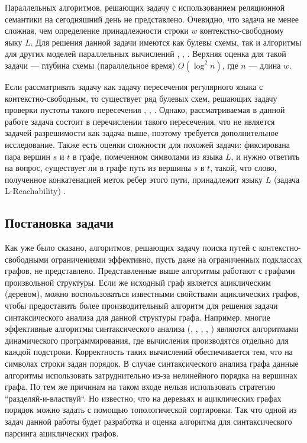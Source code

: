 \documentclass{spbau-diploma}
\begin{document}
Параллельных алгоритмов, решающих задачу с использованием реляционной семантики на сегодняшний день не представлено. Очевидно, что задача не менее сложная, чем определение принадлежности строки $w$ контекстно-свободному яыку $L$. Для решения данной задачи имеются как булевы схемы, так и алгоритмы для других моделей параллельных вычислений \cite{Brent}, \cite{Ruzzo}, \cite{Rytter}. Верхняя оценка для такой задачи --- глубина схемы (параллельное время) $O(\log^2 n)$, где $n$ --- длина $w$.

Если рассматривать задачу как задачу пересечения регулярного языка с контекстно-свободным, то существует ряд булевых схем, решающих задачу проверки пустоты такого пересечения \cite{Lohrey}, \cite{Regularrealizability}, \cite{Swernofsky2015OnTC}. Однако, рассматриваемая в данной работе задача состоит в перечислении такого пересечения, что не является задачей разрешимости как задача выше, поэтому требуется дополнительное исследование. Также есть оценки сложности для похожей задачи: фиксирована пара вершин $s$ и $t$ в графе, помеченном символами из языка $L$, и нужно ответить на вопрос, cуществует ли в графе путь из вершины $s$ в $t$, такой, что слово, полученное конкатенацией меток ребер этого пути, принадлежит языку $L$ (задача L-Reachability) \cite{LReach}.
\subsection{Постановка задачи}
Как уже было сказано, алгоритмов, решающих задачу поиска путей с контекстно-свободными ограничениями эффективно, пусть даже на ограниченных подклассах графов, не представлено. 
Представленные выше алгоритмы работают с графами произвольной
структуры. Если же исходный граф является ациклическим
(деревом), можно воспользоваться известными свойствами
ациклических графов, чтобы предоставить более
производительный алгоритм для решения задачи синтаксического
анализа для данной структуры графа. Например, многие эффективные алгоритмы синтаксического анализа (\cite{Valiant}, \cite{Kasami}, \cite{OkhotinParse}, \cite{Earley}, \cite{Yonger}) являются алгоритмами динамического программирования, где вычисления производятся отдельно для каждой подстроки. Корректность таких вычислений обеспечивается тем, что на символах строки задан порядок. В случае синтаксического анализа графа данные алгоритмы использовать затруднительно из-за нелинейного порядка на вершинах графа. По тем же причинам на таком входе нельзя использовать стратегию ``разделяй-и-властвуй``. Но известно, что на деревьях и ациклических графах порядок можно задать с помощью топологической сортировки. Так что одной из задач данной работы будет разработка и оценка алгоритма для синтаксического парсинга ациклических графов. 
\end{document}
